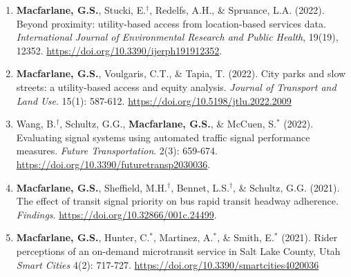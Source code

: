 \documentclass[margin,line]{res}
\newif\ifdetail{}
\newcounter{enuminitialize}
\newenvironment{myenum}[1][]
{%
 \setcounter{enuminitialize}{#1}
 \addtocounter{enuminitialize}{2}
 \begin{enumerate}[left= 4pt, itemsep=8pt, start=\value{enuminitialize}, label=\arabic*\addtocounter{enumi}{-2}]
}
{%
 \end{enumerate}
}
\begin{document}
\begin{resume}
\begin{myenum}[21]


  \item \textbf{Macfarlane, G.S.}, Stucki, E.$^\dagger$, Redelfs, A.H., \& Spruance, L.A. (2022).
  Beyond proximity: utility-based access from location-based services data.
  \textit{International Journal of Environmental Research and Public Health}, 19(19), 12352.
  \url{https://doi.org/10.3390/ijerph191912352}.


  \item \textbf{Macfarlane, G.S.}, Voulgaris, C.T., \& Tapia, T. (2022).
  City parks and slow streets: a utility-based access and equity analysis.
  \textit{Journal of Transport and Land Use}. 15(1): 587-612.
  \url{https://doi.org/10.5198/jtlu.2022.2009}


  \item Wang, B.$^\dagger$, Schultz, G.G., \textbf{Macfarlane, G.S.}, \& McCuen,
  S.$^*$ (2022). Evaluating signal systems using automated traffic signal
  performance measures. \textit{Future Transportation}. 2(3):  659-674.
  \url{https://doi.org/10.3390/futuretransp2030036}.





  \item \textbf{Macfarlane, G.S.}, Sheffield, M.H.$^\dagger$, Bennet, L.S.$^\dagger$, \& Schultz, G.G. (2021).
  The effect of transit signal priority on bus rapid transit headway adherence.
  \textit{Findings}. \url{https://doi.org/10.32866/001c.24499}.
  \ifdetail \textbf{Citations: 2} \fi

  \item\textbf{Macfarlane, G.S.}, Hunter, C.$^*$, Martinez, A.$^*$, \& Smith, E.$^*$  (2021).
  Rider perceptions of an on-demand microtransit service in Salt Lake County, Utah
  \textit{ Smart Cities} 4(2): 717-727.  \url{https://doi.org/10.3390/smartcities4020036} 
  \ifdetail \textbf{Citations: 22}\fi


\end{myenum}
\end{resume}
\end{document}
